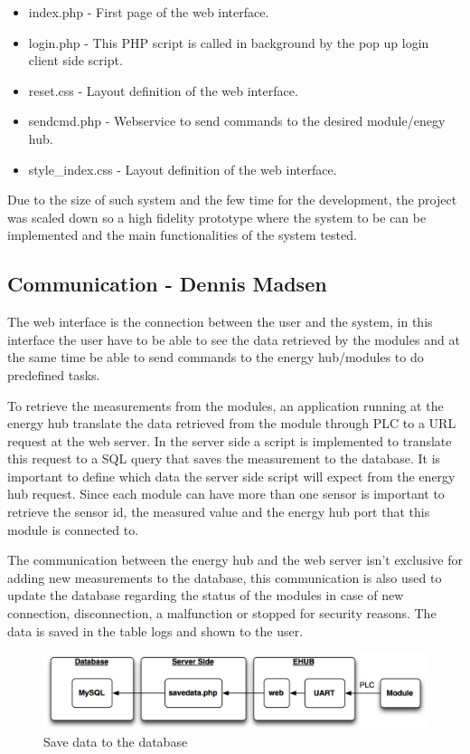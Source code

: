 \begin{itemize}
	\item index.php - First page of the web interface.
	\item login.php  - This PHP script is called in background by the pop up login client side script.
	\item reset.css - Layout definition of the web interface.
	\item sendcmd.php - Webservice to send commands to the desired module/enegy hub.
	\item style\_index.css - Layout definition of the web interface.
\end{itemize}

Due to the size of such system and the few time for the development, the project was scaled down so a high fidelity prototype where the system to be can be implemented and the main functionalities of the system tested.

\subsection{Communication - Dennis Madsen}
The web interface is the connection between the user and the system, in this interface the user have to be able to see the data retrieved by the modules and at the same time be able to send commands to the energy hub/modules to do predefined tasks.

To retrieve the measurements from the modules, an application running at the energy hub translate the data retrieved from the module through PLC to a URL request at the web server. In the server side a script is implemented to translate this request to a SQL query that saves the measurement to the database. It is important to define which data the server side script will expect from the energy hub request. Since each module can have more than one sensor is important to retrieve the sensor id, the measured value and the energy hub port that this module is connected to.

The communication between the energy hub and the web server isn't exclusive for adding new measurements to the database, this communication is also used to update the database regarding the status of the modules in case of new connection, disconnection, a malfunction or stopped for security reasons. The data is saved in the table logs and shown to the user.

\begin{figure}[H]
	\begin{centering}
		\includegraphics[width=1\textwidth]{images/savedata.png}
		\caption{Save data to the database}
	\end{centering}
\end{figure}

